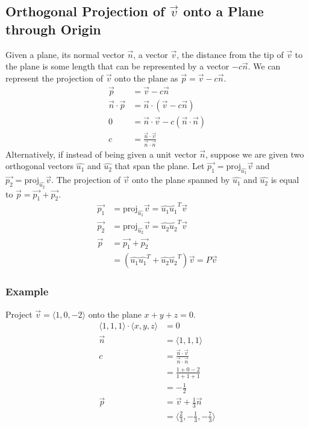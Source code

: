 \documentclass{math}
\begin{document}
\subsection*{Orthogonal Projection of \( \vec{v} \) onto a Plane through Origin}
Given a plane, its normal vector \( \vec{n} \), a vector \( \vec{v} \), the
distance from the tip of \( \vec{v} \) to the plane is some length that can be
represented by a vector \( -c\vec{n} \). We can represent the projection of
\( \vec{v} \) onto the plane as \( \vec{p} = \vec{v}-c\vec{n} \).
\begin{align*}
  \vec{p} &= \vec{v}-c\vec{n} \\
  \vec{n}\cdot\vec{p} &= \vec{n}\cdot(\vec{v}-c\vec{n}) \\
  0 &= \vec{n}\cdot\vec{v}-c(\vec{n}\cdot\vec{n}) \\
  c &= \frac{\vec{n}\cdot\vec{v}}{\vec{n}\cdot\vec{n}}
\end{align*}
Alternatively, if instead of being given a unit vector \( \vec{n} \), suppose we
are given two orthogonal vectors \( \hat{u_1} \) and \( \hat{u_2} \) that span
the plane. Let \( \vec{p_1} = \text{proj}_{\hat{u_1}}\vec{v} \) and
\( \vec{p_2} = \text{proj}_{\hat{u_2}}\vec{v} \). The projection of
\( \vec{v} \) onto the plane spanned by \( \hat{u_1} \) and \( \hat{u_2} \) is
equal to \( \vec{p} = \vec{p_1}+\vec{p_2} \).
\begin{align*}
  \vec{p_1} &= \text{proj}_{\hat{u_1}}\vec{v} = \hat{u_1}\hat{u_1}^T\vec{v} \\
  \vec{p_2} &= \text{proj}_{\hat{u_2}}\vec{v} = \hat{u_2}\hat{u_2}^T\vec{v} \\
  \vec{p} &= \vec{p_1}+\vec{p_2} \\
  &= (\hat{u_1}\hat{u_1}^T+\hat{u_2}\hat{u_2}^T)\vec{v} = P\vec{v}
\end{align*}

\subsubsection*{Example}
Project \( \vec{v} = \langle1,0,-2\rangle \) onto the plane \( x+y+z = 0 \).
\begin{align*}
  \langle1,1,1\rangle\cdot\langle x,y,z\rangle &= 0 \\
  \vec{n} &= \langle1,1,1\rangle \\
  c &= \frac{\vec{n}\cdot\vec{v}}{\vec{n}\cdot\vec{n}} \\
  &= \frac{1+0-2}{1+1+1} \\
  &= -\frac{1}{2} \\
  \vec{p} &= \vec{v}+\frac{1}{3}\vec{n} \\
  &= \langle\frac{2}{3},-\frac{1}{3},-\frac{7}{3}\rangle
\end{align*}
\end{document}
